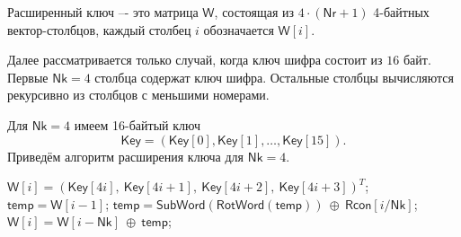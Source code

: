 Расширенный ключ –- это матрица $\mathsf{W}$, состоящая из $4 \cdot (\mathsf{Nr} + 1)$ 4-байтных вектор-столбцов, каждый столбец $i$ обозначается $\mathsf{W}[i]$.

Далее рассматривается только случай, когда ключ шифра состоит из $16$ байт. Первые $\mathsf{Nk} = 4$ столбца содержат ключ шифра. Остальные столбцы вычисляются рекурсивно из столбцов с меньшими номерами.

Для $\mathsf{Nk} = 4$ имеем 16-байтый ключ
\[
    \mathsf{Key} = (\mathsf{Key}[0], \mathsf{Key}[1], \dots, \mathsf{Key}[15]).
\]
Приведём алгоритм расширения ключа для $\mathsf{Nk} = 4$.
\begin{algorithm}[iht]
    \caption{$\mathsf{KeyExpansion}(\mathsf{Key}, \mathsf{W})$\label{alg:AES-key-exp}}
    \begin{algorithmic}
            \STATE $\mathsf{W}[i] = (\mathsf{Key}[4i], ~ \mathsf{Key}[4i+1], ~ \mathsf{Key}[4i+2], ~ \mathsf{Key}[4i+3])^T$;
        \ENDFOR
            \STATE $\mathsf{temp} = \mathsf{W}[i-1]$;
                \STATE $\mathsf{temp} = \mathsf{SubWord}(\mathsf{RotWord}(\mathsf{temp})) ~ \oplus ~ \mathsf{Rcon}[i / \mathsf{Nk}]$;
            \ENDIF
            \STATE $\mathsf{W}[i] = \mathsf{W}[i - \mathsf{Nk}] ~ \oplus ~ \mathsf{temp}$;
        \ENDFOR
    \end{algorithmic}
\end{algorithm}



